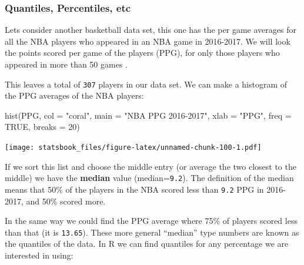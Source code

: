 \documentclass[
]{book}
\newenvironment{Shaded}{\begin{snugshade}}{\end{snugshade}}
\newcommand{\AttributeTok}[1]{\textcolor[rgb]{0.77,0.63,0.00}{#1}}
\newcommand{\ConstantTok}[1]{\textcolor[rgb]{0.00,0.00,0.00}{#1}}
\newcommand{\DecValTok}[1]{\textcolor[rgb]{0.00,0.00,0.81}{#1}}
\newcommand{\DocumentationTok}[1]{\textcolor[rgb]{0.56,0.35,0.01}{\textbf{\textit{#1}}}}
\newcommand{\FunctionTok}[1]{\textcolor[rgb]{0.00,0.00,0.00}{#1}}
\newcommand{\NormalTok}[1]{#1}
\newcommand{\OtherTok}[1]{\textcolor[rgb]{0.56,0.35,0.01}{#1}}
\newcommand{\SpecialCharTok}[1]{\textcolor[rgb]{0.00,0.00,0.00}{#1}}
\newcommand{\StringTok}[1]{\textcolor[rgb]{0.31,0.60,0.02}{#1}}
\theoremstyle{definition}
\theoremstyle{definition}
\theoremstyle{definition}
\theoremstyle{definition}
\theoremstyle{remark}
\begin{document}
\hypertarget{quantiles-percentiles-etc}{%
\subsubsection{Quantiles, Percentiles, etc}\label{quantiles-percentiles-etc}}

Lets consider another basketball data set, this one has the per game averages for all the NBA players who appeared in an NBA game in 2016-2017. We will look the points scored per game of the players (PPG), for only those players who appeared in more than 50 games .

\begin{Shaded}
\end{Shaded}

This leaves a total of \texttt{307} players in our data set. We can make a histogram of the PPG averages of the NBA players:

\begin{Shaded}
\begin{Highlighting}[]
\FunctionTok{hist}\NormalTok{(PPG, }\AttributeTok{col =} \StringTok{"coral"}\NormalTok{, }\AttributeTok{main =} \StringTok{"NBA PPG 2016{-}2017"}\NormalTok{, }\AttributeTok{xlab =} \StringTok{"PPG"}\NormalTok{, }\AttributeTok{freq =} \ConstantTok{TRUE}\NormalTok{, }\AttributeTok{breaks =} \DecValTok{20}\NormalTok{)}
\end{Highlighting}
\end{Shaded}

\texttt{[image: statsbook\_files/figure-latex/unnamed-chunk-100-1.pdf]}

If we sort this list and choose the middle entry (or average the two closest to the middle) we have the \textbf{median} value (median=\texttt{9.2}). The definition of the median means that 50\% of the players in the NBA scored less than \texttt{9.2} PPG in 2016-2017, and 50\% scored more.

In the same way we could find the PPG average where 75\% of players scored less than that (it is \texttt{13.65}).
These more general ``median'' type numbers are known as the quantiles of the data. In R we can find quantiles for any percentage we are interested in using:
\end{document}
